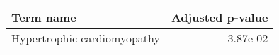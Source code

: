 \begin{tabular}{lr}
\toprule
                   Term name &  Adjusted p-value \\
\midrule
 Hypertrophic cardiomyopathy &          3.87e-02 \\
\bottomrule
\end{tabular}
